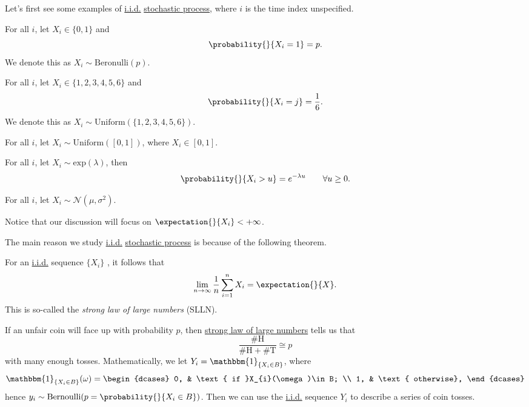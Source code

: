 Let's first see some examples of \hyperref[def:i.i.d.]{i.i.d.} \hyperref[def:stochastic-process]{stochastic process}, where \(i\) is the time index unspecified.
\begin{eg}
	For all \(i\), let \(X_{i}\in\{0, 1\}\) and
	\[
		\probability{}{X_{i} = 1} = p.
	\]
	We denote this as \(X_i\sim \mathrm{Beronulli}(p)\).
\end{eg}

\begin{eg}
	For all \(i\), let \(X_{i}\in\{1, 2, 3, 4, 5, 6\}\) and
	\[
		\probability{}{X_{i} = j} = \frac{1}{6}.
	\]
	We denote this as \(X_i\sim \mathrm{Uniform}(\{1, 2, 3, 4, 5, 6\})\).
\end{eg}

\begin{eg}
	For all \(i\), let \(X_i\sim \mathrm{Uniform}(\left[ 0, 1 \right] )\), where \(X_{i}\in\left[ 0, 1 \right] \).
\end{eg}

\begin{eg}
	For all \(i\), let \(X_i\sim \mathrm{exp}(\lambda)\), then
	\[
		\probability{}{X_{i}>u} = e^{-\lambda u}\qquad \forall u\geq 0.
	\]
\end{eg}

\begin{eg}
	For all \(i\), let \(X_i\sim \mathcal{N}(\mu, \sigma^2)\).
\end{eg}

\begin{remark}
	Notice that our discussion will focus on \(\expectation{}{X_i} < +\infty \).
\end{remark}

The main reason we study \hyperref[def:i.i.d.]{i.i.d.} \hyperref[def:stochastic-process]{stochastic process} is because of the following theorem.
\begin{theorem}\label{thm:SLLN}
	For an \hyperref[def:i.i.d.]{i.i.d.} sequence \(\{X_i\}\) , it follows that
	\[
		\lim_{n \to \infty} \frac{1}{n}\sum\limits_{i=1}^{n} X_{i} = \expectation{}{X}.
	\]
	This is so-called the \emph{strong law of large numbers} (SLLN).
\end{theorem}

\begin{eg}
	If an unfair coin will face up with probability \(p\), then \hyperref[thm:SLLN]{strong law of large numbers} tells us that
	\[
		\frac{\# \mathrm{H} }{\# \mathrm{H} + \# \mathrm{T} } \cong p
	\]
	with many enough tosses. Mathematically, we let \(Y_{i} = \mathbbm{1}_{\{X_{i}\in B\}}\), where
	\[
		\mathbbm{1}_{\{X_{i}\in B\}}(\omega) = \begin{dcases}
			0, & \text{ if }X_{i}(\omega)\in B; \\
			1, & \text{ otherwise},
		\end{dcases}
	\]
	hence \(y_{i}\sim \mathrm{Bernoulli}(p = \probability{}{X_{i}\in B})\). Then we can use the \hyperref[def:i.i.d.]{i.i.d.} sequence \(Y_i\) to
	describe a series of coin tosses.
\end{eg}

